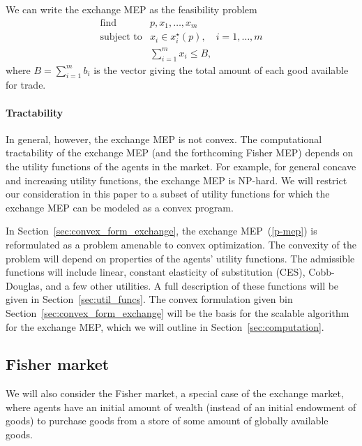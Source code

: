 \documentclass[12pt]{article}
\begin{document}
We can write the exchange MEP as the feasibility problem
\begin{equation}
\label{p-mep}
\begin{array}{ll}
\mbox{find} & p, x_1, \ldots, x_m \\
\mbox{subject to} & x_i \in x_i^\star(p),\quad i = 1,\ldots, m \\
& \sum_{i=1}^m x_i \leq B,
\end{array}
\end{equation}
where $B = \sum_{i=1}^m b_i$ is the vector giving the total amount of each good
available for trade.


\paragraph{Tractability}
In general, however, the exchange MEP is not convex.
The computational tractability of the exchange MEP
(and the forthcoming Fisher MEP) depends on the utility functions of
the agents in the market.
For example, for general concave and increasing utility functions,
the exchange MEP is NP-hard. %
We will restrict our consideration in this paper to a subset of utility
functions for which the exchange MEP can be modeled as a convex program.

In Section~\ref{sec:convex_form_exchange}, the exchange MEP~(\ref{p-mep})
is reformulated as a problem amenable to convex optimization.
The convexity of the problem will depend on properties of the
agents' utility functions.
The admissible functions will include linear, constant elasticity
of substitution (CES), Cobb-Douglas, and a few other utilities.
A full description of these functions will be given in Section~\ref{sec:util_funcs}.
The convex formulation given bin Section~\ref{sec:convex_form_exchange} will
be the basis for the scalable algorithm for the exchange MEP, which
we will outline in Section~\ref{sec:computation}.



\subsection{Fisher market}

We will also consider the Fisher market, a special case of the exchange market, where agents have an initial amount of wealth (instead of an initial endowment of goods)
to purchase goods from a store of some amount of globally available goods.
\end{document}
